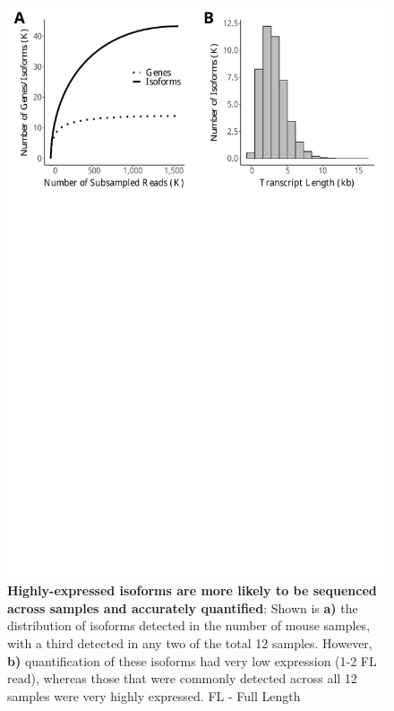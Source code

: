 \begin{figure}[!h]
	\begin{center}
		\includegraphics[page=3,trim={0 26cm 0 0},clip,scale = 0.55]{Figures/IsoSeqWholeTranscriptome.pdf}
	\end{center}
	\captionsetup{width=0.95\textwidth}
	\caption[Isoform diversity across Tg4510 samples and coverage of ERCC transcripts]%
	{\textbf{Highly-expressed isoforms are more likely to be sequenced across samples and accurately quantified}: Shown is \textbf{a)} the distribution of isoforms detected in the number of mouse samples, with a third detected in any two of the total 12 samples. However, \textbf{b)} quantification of these isoforms had very low expression (1-2 FL read), whereas those that were commonly detected across all 12 samples were very highly expressed. FL - Full Length}
	\label{fig:isoseq_whole_lowlyexp}
\end{figure}


